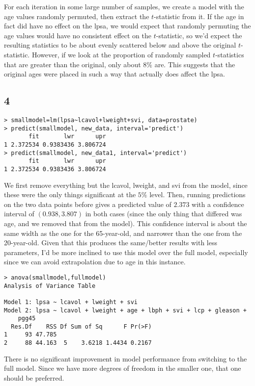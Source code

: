 \documentclass{article}
\begin{document}
For each iteration in some large number of samples, we create a model with the age values randomly permuted, then extract the $t$-statistic from it. If the age in fact did have no effect on the lpsa, we would expect that randomly permuting the age values would have no consistent effect on the $t$-statistic, so we'd expect the resulting statistics to be about evenly scattered below and above the original $t$-statistic. However, if we look at the proportion of randomly sampled $t$-statistics that are greater than the original, only about $8\%$ are. This suggests that the original ages were placed in such a way that actually does affect the lpsa.
\subsection*{4}
\begin{verbatim}
> smallmodel=lm(lpsa~lcavol+lweight+svi, data=prostate)
> predict(smallmodel, new_data, interval='predict')
       fit       lwr      upr
1 2.372534 0.9383436 3.806724
> predict(smallmodel, new_data1, interval='predict')
       fit       lwr      upr
1 2.372534 0.9383436 3.806724
\end{verbatim}

We first remove everything but the lcavol, lweight, and svi from the model, since these were the only things significant at the $5\%$ level. Then, running predictions on the two data points before gives a predicted value of $2.373$ with a confidence interval of $(0.938, 3.807)$ in both cases (since the only thing that differed was age, and we removed that from the model). This confidence interval is about the same width as the one for the 65-year-old, and narrower than the one from the 20-year-old. Given that this produces the same/better results with less parameters, I'd be more inclined to use this model over the full model, especially since we can avoid extrapolation due to age in this instance.
\begin{verbatim}
> anova(smallmodel,fullmodel)
Analysis of Variance Table

Model 1: lpsa ~ lcavol + lweight + svi
Model 2: lpsa ~ lcavol + lweight + age + lbph + svi + lcp + gleason + 
    pgg45
  Res.Df    RSS Df Sum of Sq      F Pr(>F)
1     93 47.785                           
2     88 44.163  5    3.6218 1.4434 0.2167
\end{verbatim}

There is no significant improvement in model performance from switching to the full model. Since we have more degrees of freedom in the smaller one, that one should be preferred.
\end{document}
